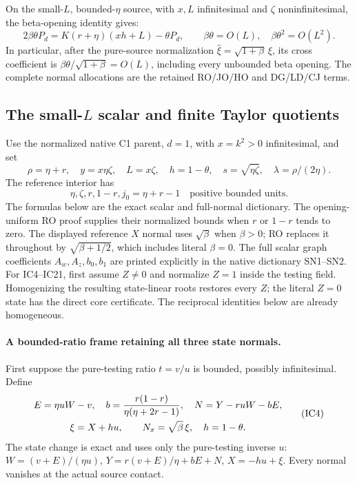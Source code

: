 On the small-$L$, bounded-$\eta$ source, with $x,L$ infinitesimal
and $\zeta$ noninfinitesimal, the beta-opening identity gives:
\[
 2\beta\theta P_d=K(r+\eta)(xh+L)-\theta P_d,
 \qquad \beta\theta=O(L),\quad \beta\theta^2=O(L^2).       \tag{SN4}
\]
In particular, after the pure-source normalization
$\widehat\xi=\sqrt{1+\beta}\,\xi$, its cross coefficient is
$\beta\theta/\sqrt{1+\beta}=O(L)$, including every unbounded
beta opening.  The complete normal allocations are the retained
RO/JO/HO and DG/LD/CJ terms.



\subsection{The small-$L$ scalar and finite Taylor quotients}

\label{component:pe3ef590c01d6}

\label{pe3ef590c01d6:sec:r9-c1-small-interior}

Use the normalized native C1 parent, $d=1$, with $x=k^2>0$
infinitesimal, and set
\[
 \rho=\eta+r,\quad y=x\eta\zeta,\quad L=x\zeta,\quad
 h=1-\theta,\quad s=\sqrt{\eta\zeta},\quad
 \lambda=\rho/(2\eta).
\]
The reference interior has
\[
 \eta,\zeta,r,1-r,j_0=\eta+r-1
       \quad\text{positive bounded units}.                    \tag{IC1}
\]
The formulas below are the exact scalar and full-normal dictionary.
The opening-uniform RO proof supplies their normalized bounds when
$r$ or $1-r$ tends to zero.  The displayed reference $X$ normal
uses $\sqrt\beta$ when $\beta>0$; RO replaces it throughout by
$\sqrt{\beta+1/2}$, which includes literal $\beta=0$.
The full scalar graph coefficients $A_w,A_z,b_0,b_1$ are printed
explicitly in the native dictionary SN1--SN2.
For IC4--IC21, first assume $Z\ne0$ and normalize $Z=1$ inside
the testing field.  Homogenizing the resulting state-linear roots
restores every $Z$; the literal $Z=0$ state has the direct core
certificate.  The reciprocal identities below are already homogeneous.
\paragraph{A bounded-ratio frame retaining all three state normals.}
First suppose the pure-testing ratio $t=v/u$ is bounded, possibly
infinitesimal. Define
\[
 \begin{gathered}
 E=\eta uW-v,\quad
 b={r(1-r)\over\eta(\eta+2r-1)},\quad
 N=Y-ruW-bE,\\
 \xi=X+hu,\qquad N_x=\sqrt\beta\,\xi,\quad h=1-\theta.
                                                               \end{gathered} \tag{IC4}
\]
The state change is exact and uses only the pure-testing inverse $u$:
$W=(v+E)/(\eta u)$, $Y=r(v+E)/\eta+bE+N$, $X=-hu+\xi$.
Every normal vanishes at the actual source contact. 

